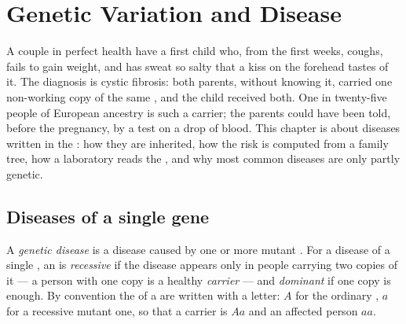 \chapter{Genetic Variation and Disease}\label{ch:g11:genes-and-disease}

A couple in perfect health have a first child who, from the first
weeks, coughs, fails to gain weight, and has sweat so salty that a
kiss on the forehead tastes of it. The diagnosis is cystic fibrosis:
both parents, without knowing it, carried one non-working copy of the
same , and the child received both. One in twenty-five people of
European ancestry is such a carrier; the parents could have been
told, before the pregnancy, by a test on a drop of blood. This chapter
is about diseases written in the : how they are inherited, how
the risk is computed from a family tree, how a laboratory reads the
, and why most common diseases are only partly genetic.

\section{Diseases of a single gene}

\begin{definition}\label{def:g11:genes-and-disease:genetic}
A \emph{genetic disease} is a disease caused by
one or more mutant . For a disease of a single , an 
is \emph{recessive} if the disease appears only in
people carrying two copies of it --- a person with one copy is a
healthy \emph{carrier} --- and \emph{dominant}
if one copy is enough. By convention the  of a  are written
with a letter: $A$ for the ordinary , $a$ for a recessive mutant
one, so that a carrier is $Aa$ and an affected person $aa$.
\end{definition}

